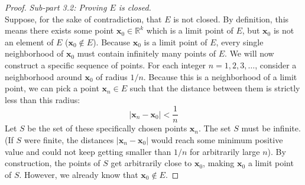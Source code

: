 \documentclass{article}
\theoremstyle{mythm}
\begin{document}
\begin{proof}
\textit{Sub-part 3.2: Proving $E$ is closed.} \\
Suppose, for the sake of contradiction, that $E$ is not closed. 
By definition, this means there exists some point $\mathbf{x}_0 \in \mathbb{R}^k$ which is a limit point of $E$, but $\mathbf{x}_0$ is not an element of $E$ ($\mathbf{x}_0 \notin E$).
Because $\mathbf{x}_0$ is a limit point of $E$, every single neighborhood of $\mathbf{x}_0$ must contain infinitely many points of $E$. 
We will now construct a specific sequence of points. For each integer $n = 1, 2, 3, \dots$, consider a neighborhood around $\mathbf{x}_0$ of radius $1/n$. Because this is a neighborhood of a limit point, we can pick a point $\mathbf{x}_n \in E$ such that the distance between them is strictly less than this radius:
\[ |\mathbf{x}_n - \mathbf{x}_0| < \frac{1}{n} \]
Let $S$ be the set of these specifically chosen points $\mathbf{x}_n$. 
The set $S$ must be infinite. (If $S$ were finite, the distances $|\mathbf{x}_n - \mathbf{x}_0|$ would reach some minimum positive value and could not keep getting smaller than $1/n$ for arbitrarily large $n$).
By construction, the points of $S$ get arbitrarily close to $\mathbf{x}_0$, making $\mathbf{x}_0$ a limit point of $S$. However, we already know that $\mathbf{x}_0 \notin E$.


\end{proof}
\end{document}
